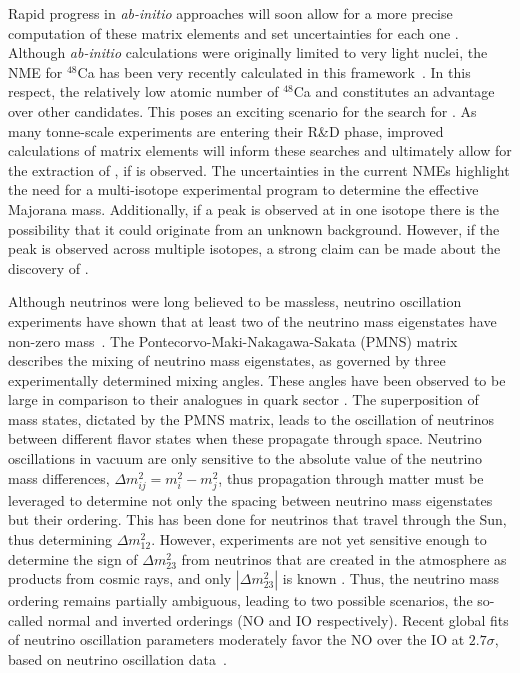 Rapid progress in \textit{ab-initio} approaches will soon allow for a more precise computation of these matrix elements and set uncertainties for each one \cite{Engel_2017}. Although \textit{ab-initio} calculations were originally limited to very light nuclei, the NME for $^{48}$Ca has been very recently calculated in this framework~\cite{ca48}. In this respect, the relatively low atomic number of $^{48}$Ca and \geEn{} constitutes an advantage over other \novbb{} candidates. This poses an exciting scenario for the search for \novbb{}. As many tonne-scale experiments are entering their R\&D phase, improved calculations of matrix elements will inform these searches and ultimately allow for the extraction of \mbb{}, if \novbb{} is observed. The uncertainties in the current NMEs highlight the need for a multi-isotope \novbb{} experimental program to determine the effective Majorana mass. Additionally, if a peak is observed at \Qbb{} in one isotope there is the possibility that it could originate from an unknown background. However, if the \Qbb{} peak is observed across multiple isotopes, a strong claim can be made about the discovery of \novbb{}. 

Although neutrinos were long believed to be massless, neutrino oscillation experiments have shown that at least two of the neutrino mass eigenstates have non-zero mass~\cite{osc_sol,osc_atm}. The Pontecorvo-Maki-Nakagawa-Sakata (PMNS) matrix describes the mixing of neutrino mass eigenstates, as governed by three experimentally determined mixing angles. These angles have been observed to be large in comparison to their analogues in quark sector \cite{pdg_revparticlephys}. The superposition of mass states, dictated by the PMNS matrix, leads to the oscillation of neutrinos between different flavor states when these propagate through space. Neutrino oscillations in vacuum are only sensitive to the absolute value of the neutrino mass differences, $\Delta m^2_{ij} = m^2_i - m^2_j$, thus propagation through matter must be leveraged to determine not only the spacing between neutrino mass eigenstates but their ordering. This has been done for neutrinos that travel through the Sun, thus determining $\Delta m^2_{12}$. However, experiments are not yet sensitive enough to determine the sign of $\Delta m^2_{23}$ from neutrinos that are created in the atmosphere as products from cosmic rays, and only $|\Delta m^2_{23}|$ is known \cite{osc_rev}. Thus, the neutrino mass ordering remains partially ambiguous, leading to two possible scenarios, the so-called normal and inverted orderings (NO and IO respectively). Recent global fits of neutrino oscillation parameters moderately favor the NO over the IO at $2.7\sigma$, based on neutrino oscillation data~\cite{NH}. 


